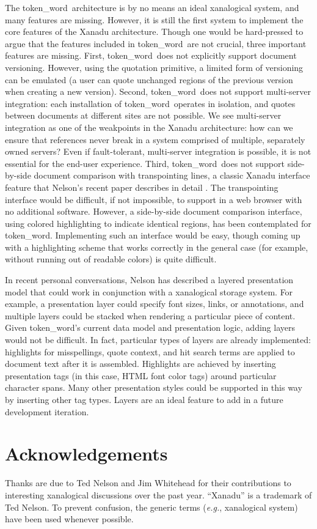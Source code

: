 \documentclass{acm_proc_article-sp}
\newcommand{\tokenWord}{token\_word}
\begin{document}
The \tokenWord \  architecture is by no means an ideal xanalogical system, and many features are missing.
However, it is still the first system to implement the core features of the Xanadu architecture.
Though one would be hard-pressed to argue that the features included in \tokenWord \  are not crucial, three important features are missing.
First, \tokenWord \  does not explicitly support document versioning.
However, using the quotation primitive, a limited form of versioning can be emulated (a user can quote unchanged regions of the previous version when creating a new version).
Second, \tokenWord \  does not support multi-server integration:  each installation of \tokenWord \  operates in isolation, and quotes between documents at different sites are not possible.
We see multi-server integration as one of the weakpoints in the Xanadu architecture:  how can we ensure that references never break in a system comprised of multiple, separately owned servers?
Even if fault-tolerant, multi-server integration is possible, it is not essential for the end-user experience. 
Third, \tokenWord \   does not support side-by-side document comparison with transpointing lines, a classic Xanadu interface feature that Nelson's recent paper describes in detail \cite{Nelson1999}.
The transpointing interface would be difficult, if not impossible, to support in a web browser with no additional software.
However, a side-by-side document comparison interface, using colored highlighting to indicate identical regions, has been contemplated for \tokenWord.
Implementing such an interface would be easy, though coming up with a highlighting scheme that works correctly in the general case (for example, without running out of readable colors) is quite difficult.

In recent personal conversations, Nelson has described a layered presentation model that could work in conjunction with a xanalogical storage system.
For example, a presentation layer could specify font sizes, links, or annotations, and multiple layers could be stacked when rendering a particular piece of content.
Given \tokenWord's current data model and presentation logic, adding layers would not be difficult.
In fact, particular types of layers are already implemented:  highlights for misspellings, quote context, and hit search terms are applied to document text after it is assembled.
Highlights are achieved by inserting presentation tags (in this case, HTML font color tags) around particular character spans.
Many other presentation styles could be supported in this way by inserting other tag types.
Layers are an ideal feature to add in a future development iteration.

\section{Acknowledgements}
Thanks are due to Ted Nelson and Jim Whitehead for their contributions to interesting xanalogical discussions over the past year. ``Xanadu'' is a trademark of Ted Nelson.  To prevent confusion, the generic terms (\textit{e.g.}, xanalogical system) have been used whenever possible.



\end{document}
